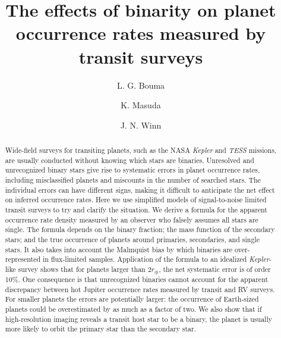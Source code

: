 \documentclass[12pt,modern]{aastex61}
\begin{document}
    
\title{ The effects of binarity on planet occurrence rates measured by
transit surveys}
%
%
\author{L. G. Bouma}
\author{K. Masuda}
\author{J. N. Winn}
%
%
\begin{abstract}
%

Wide-field surveys for transiting planets, such as the NASA {\it
Kepler} and {\it TESS} missions, are usually conducted without knowing
which stars are binaries. Unresolved and unrecognized binary stars
give rise to systematic errors in planet occurrence rates, including
misclassified planets and miscounts in the number of searched stars.
The individual errors can have different signs, making it difficult to
anticipate the net effect on inferred occurrence rates. Here we use
simplified models of signal-to-noise limited transit surveys to try
and clarify the situation. We derive a formula for the apparent
occurrence rate density measured by an observer who falsely assumes
all stars are single. The formula depends on the binary fraction; the
mass function of the secondary stars; and the true occurrence of
planets around primaries, secondaries, and single stars. It also takes
into account the Malmquist bias by which binaries are over-represented
in flux-limited samples. Application of the formula to an idealized
{\it Kepler}-like survey shows that for planets larger than
$2r_\oplus$, the net systematic error is of order 10\%.  One
consequence is that unrecognized binaries cannot account for the
apparent discrepancy between hot Jupiter occurrence rates measured by
transit and RV surveys.  For smaller planets the errors are
potentially larger: the occurrence of Earth-sized planets could be
overestimated by as much as a factor of two. We also show that if
high-resolution imaging reveals a transit host star to be a binary,
the planet is usually more likely to orbit the primary star than the
secondary star.
%
\end{abstract}
%
%
%

\end{document}
